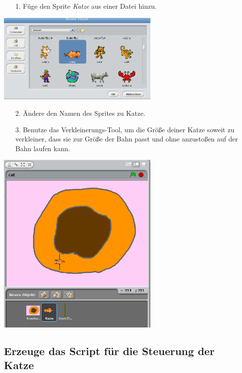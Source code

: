 \begin{itemize}
\item[1.] F{\"u}ge den Sprite \emph{Katze} aus einer Datei hinzu.
\end{itemize}
\includegraphics[width=0.6\textwidth]{images/aufgabe4_katze_sprite.png}
\begin{itemize}
\item[2. ] Ändere den Namen des Sprites zu Katze.
\end{itemize}
\begin{itemize}
\item[3.] Benutze das Verkleinerungs-Tool, um die Größe deiner Katze soweit zu verkleiner, dass sie zur Größe der Bahn passt und ohne anzusto{\ss}en auf der Bahn laufen kann.
\end{itemize}
\includegraphics[width=0.6\textwidth]{images/aufgabe4_katze_schrumpfen.png}

\subsection{Erzeuge das Script für die Steuerung der Katze}

